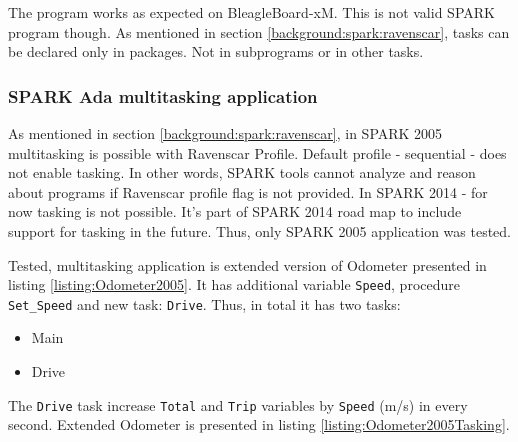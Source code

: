 The program works as expected on BleagleBoard-xM. This is not valid SPARK program though. As mentioned in section \ref{background:spark:ravenscar}, tasks can be declared only in packages. Not in subprograms or in other tasks. \cite{Barnes:Book} 

\subsubsection{SPARK Ada multitasking application}

As mentioned in section \ref{background:spark:ravenscar}, in SPARK 2005 multitasking is possible with Ravenscar Profile. Default profile - sequential -  does not enable tasking. In other words, SPARK tools cannot analyze and reason about programs if Ravenscar profile flag is not provided. In SPARK 2014 - for now tasking is not possible. It's part of SPARK 2014 road map to include support for tasking in the future. Thus, only SPARK 2005 application was tested.

Tested, multitasking application is extended version of Odometer presented in listing \ref{listing:Odometer2005}. It has additional variable \lstinline{Speed}, procedure \lstinline{Set_Speed} and new task: \lstinline{Drive}. Thus, in total it has two tasks:
\begin{itemize}
    \item Main
    \item Drive
\end{itemize}

The \lstinline{Drive} task increase \lstinline{Total} and \lstinline{Trip} variables by \lstinline{Speed} (m/s) in every second. Extended Odometer is presented in listing \ref{listing:Odometer2005Tasking}. 

